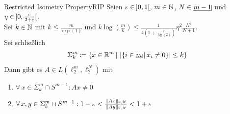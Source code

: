 \begin{satz}{Restricted Isometry Property}{RIP}
Seien $\varepsilon \in\!\  ]0,1[$, $m \in \mathbb{N}$, $N \in \haken {m-1}$ und
$\eta \in \!\ ]0, \frac {\varepsilon}{2+\varepsilon}[$.\\
Sei $k \in \mathbb{N}$ mit $k \le \frac m {\exp(1)}$ und
$k\log\left(\frac m k \right) \le \frac 1 {4 \left(1+ \frac 2{\log(2)}
 \right)}\eta^2 \frac {N^2}{N+1}$.\\
Sei schließlich
\[\Sigma_k^m \coloneqq  \menge{x \in\R^m}{\abs{\menge{i\in\haken m}{x_i\neq 0}}\le k}\]
Dann gibt es $A \in L(\ell_2^m, \ell_2^N)$ mit
\begin{enumerate}[(1)]
	\item \label{RIP1}
	$\forall\, x \in \Sigma_k^m \cap S^{m-1}: Ax \neq 0$
	\item \label{RIP2}
	$\forall\, x, y \in \Sigma_k^m\cap S^{m-1}:
	1-\varepsilon < \frac{\lVert Ax\rVert_{2, N}}{\lVert Ay\rVert_{2, N}} < 1 + \varepsilon$
\end{enumerate}
\end{satz}
